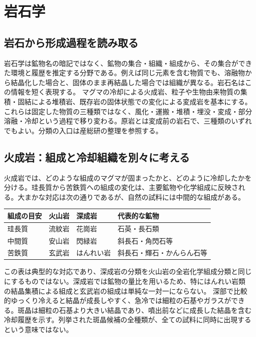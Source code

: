 \chapter{岩石学}
\section{岩石から形成過程を読み取る}
\label{theory:petrology:cycle}
岩石学は鉱物名の暗記ではなく、鉱物の集合・組織・組成から、その集合ができた環境と履歴を推定する分野である。例えば同じ元素を含む物質でも、溶融物から結晶化した場合と、固体のまま再結晶した場合では組織が異なる。岩石名はこの情報を短く表現する。
マグマの冷却による火成岩、粒子や生物由来物質の集積・固結による堆積岩、既存岩の固体状態での変化による変成岩を基本にする。これらは固定した物質の三種類ではなく、風化・運搬・堆積・埋没・変成・部分溶融・冷却という過程で移り変わる。原岩とは変成前の岩石で、三種類のいずれでもよい。分類の入口は産総研の整理を参照する\cite{gsj_rock_classification}。

\section{火成岩：組成と冷却組織を別々に考える}
\label{theory:petrology:igneous}
火成岩では、どのような組成のマグマが固まったかと、どのように冷却したかを分ける。珪長質から苦鉄質への組成の変化は、主要鉱物や化学組成に反映される。大まかな対応は次の通りであるが、自然の試料には中間的な組成がある\cite{gsj_igneous2021}。
\begin{center}\begin{tabular}{llll}\toprule
組成の目安 & 火山岩 & 深成岩 & 代表的な鉱物\\\midrule
珪長質 & 流紋岩 & 花崗岩 & 石英・長石類\\
中間質 & 安山岩 & 閃緑岩 & 斜長石・角閃石等\\
苦鉄質 & 玄武岩 & はんれい岩 & 斜長石・輝石・かんらん石等\\\bottomrule
\end{tabular}\end{center}
この表は典型的な対応であり、深成岩の分類を火山岩の全岩化学組成分類と同じにするものではない。深成岩では鉱物の量比を用いるため、特にはんれい岩類の結晶集積による組成と玄武岩の組成は単純な一対一にならない\cite{gsj_igneous2021}。
深部で比較的ゆっくり冷えると結晶が成長しやすく、急冷では細粒の石基やガラスができる。斑晶は細粒の石基より大きい結晶であり、噴出前などに成長した結晶を含む冷却履歴を示す。列挙された斑晶候補の全種類が、全ての試料に同時に出現するという意味ではない。

